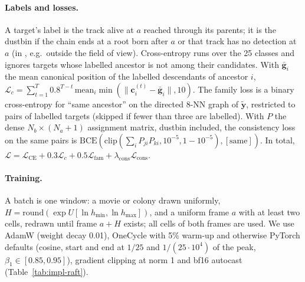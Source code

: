 \paragraph{Labels and losses.}
A target's label is the track alive at $a$ reached through its parents; it is the dustbin if the chain ends at a root born after $a$ or that track has no detection at $a$ (in \rodsim, e.g.\ outside the field of view).
Cross-entropy runs over the 25 classes and ignores targets whose labelled ancestor is not among their candidates.
With $\bar{\mathbf{g}}_i$ the mean canonical position of the labelled descendants of ancestor $i$, $\mathcal{L}_c=\sum_{t=1}^{T}0.8^{T-t}\,\mathrm{mean}_i\min(\|\mathbf{c}^{(t)}_i{-}\bar{\mathbf{g}}_i\|,10)$.
The family loss is a binary cross-entropy for ``same ancestor'' on the directed 8-NN graph of $\tilde{\mathbf{y}}$, restricted to pairs of labelled targets (skipped if fewer than three are labelled).
With $P$ the dense $N_b{\times}(N_a{+}1)$ assignment matrix, dustbin included, the consistency loss on the same pairs is $\mathrm{BCE}(\mathrm{clip}(\sum_iP_{ji}P_{ki},10^{-5},1{-}10^{-5}),[\text{same}])$.
In total, $\mathcal{L}=\mathcal{L}_{\text{CE}}+0.3\mathcal{L}_c+0.5\mathcal{L}_{\text{fam}}+\lambda_{\text{cons}}\mathcal{L}_{\text{cons}}$.

\paragraph{Training.}
A batch is one window: a movie or colony drawn uniformly, $H=\mathrm{round}(\exp U[\ln h_{\min},\ln h_{\max}])$, and a uniform frame $a$ with at least two cells, redrawn until frame $a{+}H$ exists; all cells of both frames are used.
We use AdamW (weight decay 0.01), OneCycle with 5\% warm-up and otherwise PyTorch defaults (cosine, start and end at $1/25$ and $1/(25{\cdot}10^4)$ of the peak, $\beta_1\in[0.85,0.95]$), gradient clipping at norm 1 and bf16 autocast (Table~\ref{tab:impl-raft}).

